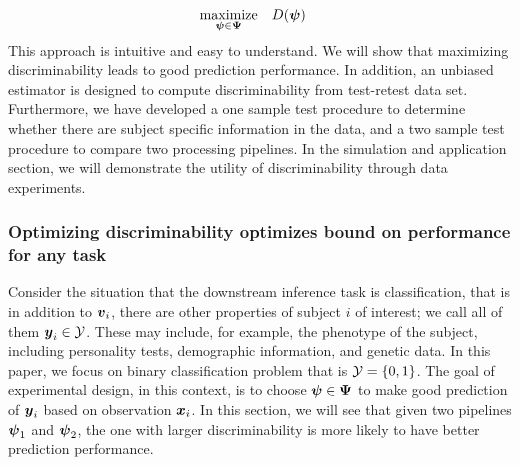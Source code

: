 \documentclass{article}
\begin{document}
\begin{equation} 
\begin{aligned}
& \underset{\boldsymbol{\psi} \in \boldsymbol{\Psi}}{\text{maximize}}
& & D(\boldsymbol{\psi})
\end{aligned}
\end{equation}
This approach is intuitive and easy to understand. We will show that maximizing discriminability leads to good prediction performance. In addition, an unbiased estimator is designed to compute discriminability from test-retest data set. Furthermore, we have developed a one sample test procedure to determine whether there are subject specific information in the data, and a two sample test procedure to compare two processing pipelines.  In the simulation and application section, we will demonstrate the utility of discriminability through data experiments.



\subsubsection{Optimizing discriminability optimizes bound on performance for any task}

Consider the situation that the downstream inference task is classification, that is in addition to $\boldsymbol{v}_i$, there are other properties of subject $i$ of interest; we call all of them $\boldsymbol{y}_i \in \mathcal{Y}$.  These may include, for example, the phenotype of the subject, including personality tests, demographic information, and genetic data. In this paper, we focus on binary classification problem that is $\mathcal{Y}=\{0,1\}$. The goal of experimental design, in this context, is to choose $\boldsymbol{\psi} \in \boldsymbol{\Psi}$ to make good prediction of $\boldsymbol{y}_i$ based on observation $\boldsymbol{x}_i$. In this section, we will see that given two pipelines $\boldsymbol{\psi}_1$ and $\boldsymbol{\psi}_2$, the one with larger discriminability is more likely to have better prediction performance.  
\end{document}
